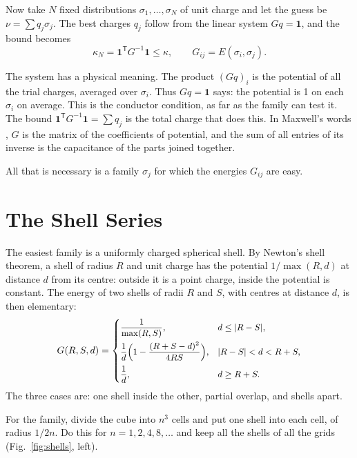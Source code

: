 \documentclass[journal]{IEEEtran}
\newcommand{\one}{\mathbf 1}
\newcommand{\T}{\mathsf T}
\begin{document}
Now take $N$ fixed distributions $\sigma_1,\dots,\sigma_N$ of unit charge and let the guess be $\nu = \sum q_j \sigma_j$. The best charges $q_j$ follow from the linear system $Gq = \one$, and the bound becomes
\begin{equation}
\kappa_N = \one^{\T} G^{-1} \one \le \kappa, \qquad G_{ij} = E(\sigma_i, \sigma_j).
\label{eq:bound}
\end{equation}

The system has a physical meaning. The product $(Gq)_i$ is the potential of all the trial charges, averaged over $\sigma_i$. Thus $Gq = \one$ says: the potential is 1 on each $\sigma_i$ on average. This is the conductor condition, as far as the family can test it. The bound $\one^{\T} G^{-1} \one = \sum q_j$ is the total charge that does this. In Maxwell's words \cite{maxwell}, $G$ is the matrix of the coefficients of potential, and the sum of all entries of its inverse is the capacitance of the parts joined together.

All that is necessary is a family $\sigma_j$ for which the energies $G_{ij}$ are easy.

\section{The Shell Series}
The easiest family is a uniformly charged spherical shell. By Newton's shell theorem, a shell of radius $R$ and unit charge has the potential $1/\max(R, d)$ at distance $d$ from its centre: outside it is a point charge, inside the potential is constant. The energy of two shells of radii $R$ and $S$, with centres at distance $d$, is then elementary:
\begin{equation}
\small
G(R,S,d)=
\begin{cases}
\dfrac{1}{\max(R,S)}, & d \le |R-S|,\\[8pt]
\dfrac{1}{d}\Big(1-\dfrac{(R+S-d)^2}{4RS}\Big), & |R-S| < d < R+S,\\[8pt]
\dfrac{1}{d}, & d \ge R+S.
\end{cases}
\label{eq:shell}
\end{equation}
The three cases are: one shell inside the other, partial overlap, and shells apart.

For the family, divide the cube into $n^3$ cells and put one shell into each cell, of radius $1/2n$. Do this for $n = 1, 2, 4, 8, \dots$ and keep all the shells of all the grids (Fig.~\ref{fig:shells}, left).
\end{document}

